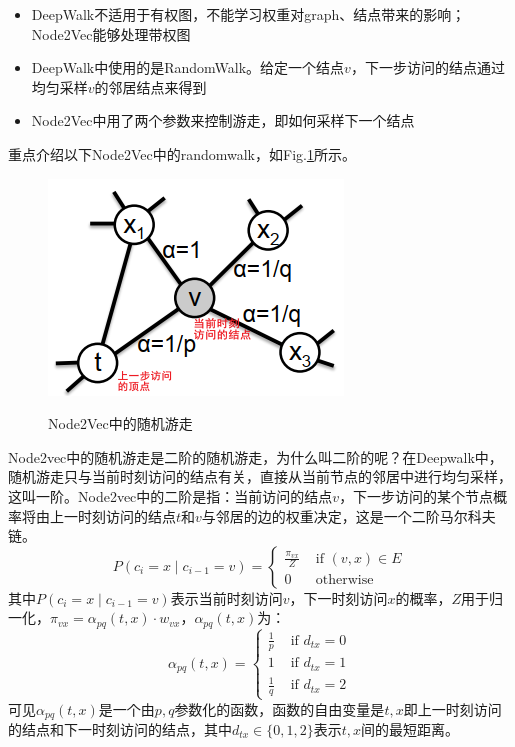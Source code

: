 \begin{itemize}
	\item DeepWalk不适用于有权图，不能学习权重对graph、结点带来的影响；Node2Vec能够处理带权图
	\item DeepWalk中使用的是RandomWalk。给定一个结点$v$，下一步访问的结点通过均匀采样$v$的邻居结点来得到
	\item Node2Vec中用了两个参数来控制游走，即如何采样下一个结点
\end{itemize}
重点介绍以下Node2Vec中的randomwalk，如Fig.\ref{fig:node2vec}所示。
\begin{figure}[h]
	\centering
	\includegraphics[width=.5\textwidth]{pics/node2vec.png}
	\label{fig:node2vec}
	\caption{Node2Vec中的随机游走}
\end{figure}
Node2vec中的随机游走是二阶的随机游走，为什么叫二阶的呢？在Deepwalk中，随机游走只与当前时刻访问的结点有关，直接从当前节点的邻居中进行均匀采样，这叫一阶。Node2vec中的二阶是指：当前访问的结点$v$，下一步访问的某个节点概率将由上一时刻访问的结点$t$和$v$与邻居的边的权重决定，这是一个二阶马尔科夫链。
$$
P(c_{i}=x \mid c_{i-1}=v)=\left\{\begin{array}{ll}
	\frac{\pi_{v x}}{Z} & \text { if }(v, x) \in E \\
	0 & \text { otherwise }
\end{array}\right.
$$
其中$P(c_{i}=x \mid c_{i-1}=v)$表示当前时刻访问$v$，下一时刻访问$x$的概率，$Z$用于归一化，$\pi_{vx} = \alpha_{pq}(t,x) \cdot w_{vx}$，$\alpha_{pq}(t, x)$为：
$$
\alpha_{p q}(t, x)=\left\{\begin{array}{ll}
	\frac{1}{p} & \text { if } d_{t x}=0 \\
	1 & \text { if } d_{t x}=1 \\
	\frac{1}{q} & \text { if } d_{t x}=2
\end{array}\right.
$$
可见$\alpha_{pq}(t, x)$是一个由$p, q$参数化的函数，函数的自由变量是$t, x$即上一时刻访问的结点和下一时刻访问的结点，其中$d_{tx} \in \{0, 1, 2\}$表示$t, x$间的最短距离。

